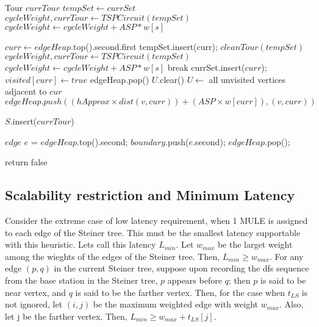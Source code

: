 \begin{algorithm}
\begin{algorithmic}
	
	\State Tour $currTour$ 
	\State $tempSet \gets currSet$ 
	\State $cycleWeight , currTour \gets TSPCircuit(tempSet)$
		$cycleWeight \gets cycleWeight + ASP*w[s]$
	\EndFor
	
		\State $curr \gets edgeHeap$.top().second.first 
		\State tempSet.insert(curr);
		\State $cleanTour(tempSet)$
		\State $cycleWeight, currTour \gets TSPCircuit(tempSet)$ 
			$cycleWeight \gets cycleWeight + ASP*w[s]$
		\EndFor
			\State break 
		\EndIf
		\State currSet.insert($curr$);
		\State $visited[curr] \gets true$ 
		\State edgeHeap.pop() 
		\State $U$.clear() 
		\State $U  \gets$ all unvisited vertices adjacent to $cur$ 
			\State $edgeHeap.push((hApprox \times dist(v,curr)) + (ASP\times w[curr]) , (v,curr))$ 
		\EndFor
	\EndWhile
	
	\State $S$.insert($currTour$) 

		\State $edge$ $e$ = $edgeHeap$.top().second;
		\State $boundary$.push($e$.second);
		\State $edgeHeap$.pop();
	\EndWhile
	
		\State return false 
	\EndIf

\EndWhile
\EndFunction

\EndFunction

\end{algorithmic}
\end{algorithm}

\pagebreak


\subsection{Scalability restriction and Minimum Latency}
Consider the extreme case of low latency requirement, when 1 MULE is assigned to each edge of the Steiner tree. This must be the smallest latency supportable with this heuristic. Lets call this latency $L_{min}$. Let $w_{max}$ be the larget weight among the wieghts of the edges of the Steiner tree. Then, $L_{min} \ge w_{max}$.
For any edge $(p,q)$ in the current Steiner tree, suppose upon recording the dfs sequence from the base station in the Steiner tree, $p$ appears before $q$; then $p$ is said to be near vertex, and $q$ is said to be the farther vertex. Then, for the case when $t_{LS}$ is not ignored, let $(i,j)$ be the maximum weighted edge with weight $w_{max}$. Also, let j be the farther 
vertex. Then, $L_{min} \ge w_{max}+t_{LS}[j]$.

